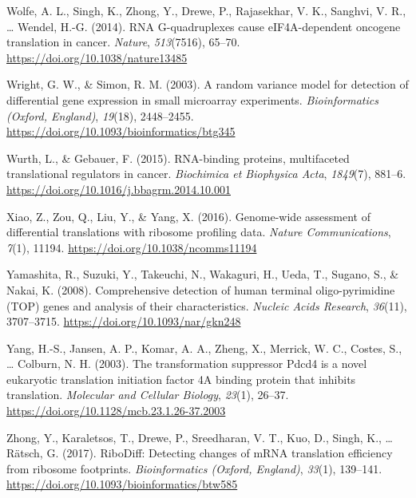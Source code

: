 \documentclass[12pt,openany]{book}
\begin{document}
\hypertarget{ref-Wolfe2014}{}
Wolfe, A. L., Singh, K., Zhong, Y., Drewe, P., Rajasekhar, V. K.,
Sanghvi, V. R., \ldots{} Wendel, H.-G. (2014). RNA G-quadruplexes cause
eIF4A-dependent oncogene translation in cancer. \emph{Nature},
\emph{513}(7516), 65--70. \url{https://doi.org/10.1038/nature13485}

\hypertarget{ref-Wright2003}{}
Wright, G. W., \& Simon, R. M. (2003). A random variance model for
detection of differential gene expression in small microarray
experiments. \emph{Bioinformatics (Oxford, England)}, \emph{19}(18),
2448--2455. \url{https://doi.org/10.1093/bioinformatics/btg345}

\hypertarget{ref-Wurth2015}{}
Wurth, L., \& Gebauer, F. (2015). RNA-binding proteins, multifaceted
translational regulators in cancer. \emph{Biochimica et Biophysica
Acta}, \emph{1849}(7), 881--6.
\url{https://doi.org/10.1016/j.bbagrm.2014.10.001}

\hypertarget{ref-Xiao2016}{}
Xiao, Z., Zou, Q., Liu, Y., \& Yang, X. (2016). Genome-wide assessment
of differential translations with ribosome profiling data. \emph{Nature
Communications}, \emph{7}(1), 11194.
\url{https://doi.org/10.1038/ncomms11194}

\hypertarget{ref-Yamashita2008}{}
Yamashita, R., Suzuki, Y., Takeuchi, N., Wakaguri, H., Ueda, T., Sugano,
S., \& Nakai, K. (2008). Comprehensive detection of human terminal
oligo-pyrimidine (TOP) genes and analysis of their characteristics.
\emph{Nucleic Acids Research}, \emph{36}(11), 3707--3715.
\url{https://doi.org/10.1093/nar/gkn248}

\hypertarget{ref-Yang2003}{}
Yang, H.-S., Jansen, A. P., Komar, A. A., Zheng, X., Merrick, W. C.,
Costes, S., \ldots{} Colburn, N. H. (2003). The transformation
suppressor Pdcd4 is a novel eukaryotic translation initiation factor 4A
binding protein that inhibits translation. \emph{Molecular and Cellular
Biology}, \emph{23}(1), 26--37.
\url{https://doi.org/10.1128/mcb.23.1.26-37.2003}

\hypertarget{ref-Zhong2017}{}
Zhong, Y., Karaletsos, T., Drewe, P., Sreedharan, V. T., Kuo, D., Singh,
K., \ldots{} Rätsch, G. (2017). RiboDiff: Detecting changes of mRNA
translation efficiency from ribosome footprints. \emph{Bioinformatics
(Oxford, England)}, \emph{33}(1), 139--141.
\url{https://doi.org/10.1093/bioinformatics/btw585}
\end{document}
